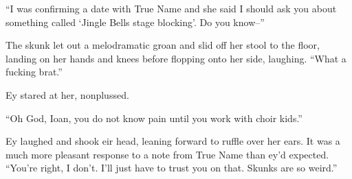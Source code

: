 ``I was confirming a date with True Name and she said I should ask you about something called `Jingle Bells stage blocking'. Do you know--''

The skunk let out a melodramatic groan and slid off her stool to the floor, landing on her hands and knees before flopping onto her side, laughing. ``What a fucking brat.''

Ey stared at her, nonplussed.

``Oh God, Ioan, you do not know pain until you work with choir kids.''

Ey laughed and shook eir head, leaning forward to ruffle over her ears. It was a much more pleasant response to a note from True Name than ey'd expected. ``You're right, I don't. I'll just have to trust you on that. Skunks are so weird.''
